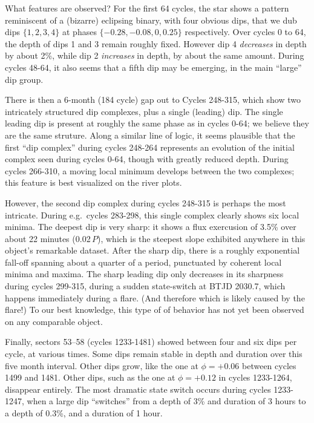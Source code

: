 \documentclass[11pt,twocolumn,tighten]{aastex63}
\begin{document}
What features are observed?  For the first 64 cycles, the star shows a
pattern reminiscent of a (bizarre) eclipsing binary, with four obvious
dips, that we dub dips $\{ 1, 2, 3, 4 \}$ at phases $\{ -0.28, -0.08,
0, 0.25 \}$ respectively.  Over cycles 0 to 64, the depth of dips 1
and 3 remain roughly fixed.  However dip 4 {\it decreases} in depth by
about 2\%, while dip 2 {\it increases} in depth, by about the same
amount.  During cycles 48-64, it also seems that a fifth dip may be
emerging, in the main ``large'' dip group.

There is then a 6-month (184 cycle) gap out to Cycles 248-315, which
show two intricately structured dip complexes, plus a single (leading)
dip.  The single leading dip is present at roughly the same phase as
in cycles 0-64; we believe they are the same struture.  Along a
similar line of logic, it seems plausible that the first ``dip
complex'' during cycles 248-264 represents an evolution of the initial
complex seen during cycles 0-64, though with greatly reduced depth.
During cycles 266-310, a moving local minimum develops between the two
complexes; this feature is best visualized on the river plots.

However, the second dip complex during cycles 248-315 is perhaps the
most intricate.  During e.g.~cycles 283-298, this single complex
clearly shows six local minima.  The deepest dip is very sharp: it
shows a flux exercusion of 3.5\% over about 22 minutes (0.02\,$P$),
which is the steepest slope exhibited anywhere in this object's
remarkable dataset.  After the sharp dip, there is a roughly
exponential fall-off spanning about a quarter of a period, punctuated
by coherent local minima and maxima.  The sharp leading dip only
decreases in its sharpness during cycles 299-315, during a sudden
state-switch at BTJD 2030.7, which happens immediately during a flare.
(And therefore which is likely caused by the flare!) To our best
knowledge, this type of of behavior has not yet been observed on any
comparable object.

Finally, sectors 53--58 (cycles 1233-1481) showed between four and six
dips per cycle, at various times.  Some dips remain stable in depth
and duration over this five month interval.  Other dips grow, like the
one at $\phi = +0.06$ between cycles 1499 and 1481.  Other dips, such
as the one at $\phi = +0.12$ in cycles 1233-1264, disappear entirely.
The most dramatic state switch occurs during cycles 1233-1247, when a
large dip ``switches'' from a depth of 3\% and duration of 3 hours to
a depth of 0.3\%, and a duration of 1 hour.
\end{document}
